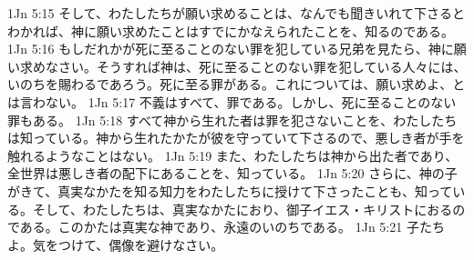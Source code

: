 1Jn 5:15  そして、わたしたちが願い求めることは、なんでも聞きいれて下さるとわかれば、神に願い求めたことはすでにかなえられたことを、知るのである。
1Jn 5:16  もしだれかが死に至ることのない罪を犯している兄弟を見たら、神に願い求めなさい。そうすれば神は、死に至ることのない罪を犯している人々には、いのちを賜わるであろう。死に至る罪がある。これについては、願い求めよ、とは言わない。
1Jn 5:17  不義はすべて、罪である。しかし、死に至ることのない罪もある。
1Jn 5:18  すべて神から生れた者は罪を犯さないことを、わたしたちは知っている。神から生れたかたが彼を守っていて下さるので、悪しき者が手を触れるようなことはない。
1Jn 5:19  また、わたしたちは神から出た者であり、全世界は悪しき者の配下にあることを、知っている。
1Jn 5:20  さらに、神の子がきて、真実なかたを知る知力をわたしたちに授けて下さったことも、知っている。そして、わたしたちは、真実なかたにおり、御子イエス・キリストにおるのである。このかたは真実な神であり、永遠のいのちである。
1Jn 5:21  子たちよ。気をつけて、偶像を避けなさい。



